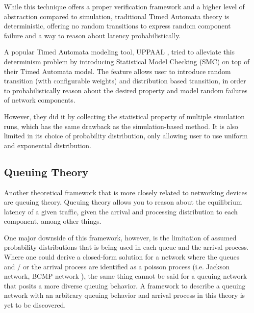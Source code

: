 While this technique offers a proper verification framework and a higher level of abstraction 
compared to simulation, traditional Timed Automata theory is deterministic, offering no random 
transitions to express random component failure and a way to reason about latency probabilistically.

A popular Timed Automata modeling tool, UPPAAL \cite{uppaal}, tried to alleviate this determinism problem by 
introducing Statistical Model Checking (SMC) on top of their Timed Automata model. 
The feature allows user to introduce random transition (with configurable weights) and distribution 
based transition, in order to probabilistically reason about the desired property and model 
random failures of network components.

However, they did it by collecting the statistical property of multiple simulation runs, which 
has the same drawback as the simulation-based method. 
It is also limited in its choice of probability distribution, only allowing user to use uniform and 
exponential distribution.

\subsection{Queuing Theory}
Another theoretical framework that is more closely related to networking devices are queuing 
theory.
Queuing theory allows you to reason about the equilibrium latency of a given traffic, given the 
arrival and processing distribution to each component, among other things.

One major downside of this framework, however, is the limitation of assumed probability 
distributions that is being used in each queue and the arrival process. 
Where one could derive a closed-form solution for a network where the queues and / or the arrival process 
are identified as a poisson process (i.e. Jackson network, BCMP network \cite{bcmp}), 
the same thing cannot be said for a queuing network that posits a more diverse queuing behavior.
A framework to describe a queuing network with an arbitrary queuing behavior and arrival process in this 
theory is yet to be discovered.

\subsection{\tool}

